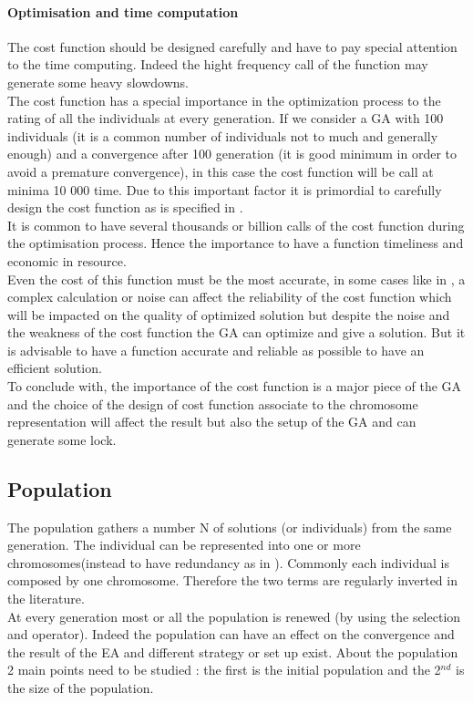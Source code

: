 \paragraph*{Optimisation and time computation}
The cost function should be designed carefully and have to pay special attention to the time computing. Indeed the hight frequency call of the function may generate some heavy slowdowns. \\
The cost function has a special importance in the optimization process to  the rating of all the individuals at every generation. If we consider a GA with 100 individuals (it is a common number of individuals  not to much and  generally enough) and a convergence after 100 generation (it is good minimum in order to avoid a premature convergence), in this case the cost function will be call at minima 10 000 time. Due  to this important factor it is primordial to carefully design the cost function as is specified in \cite{70*arabas1994}.\\
It is common to have several thousands or billion calls of the cost function during the optimisation process.
  Hence the importance to have a function timeliness and economic in resource. \\
Even the cost of this function must be the most accurate, in some cases like in \cite{95*miller1995}, a complex calculation or noise can affect the reliability of the cost function which will be impacted on the quality of optimized solution but despite the noise and the weakness of the cost function the GA can optimize and give a solution. But it is advisable to have a function accurate and reliable as possible to have an efficient solution.\\
 To conclude with, the importance of the cost function is a major piece of the GA and the choice of the design of cost function associate to the chromosome representation will affect the result but also the setup of the GA and can generate some lock. \\

	
\subsection{Population }\label{sec:Population}
The population gathers a number N of solutions (or individuals) from the same generation. The individual can be represented into one or  more chromosomes(instead to have redundancy as in \cite{ 121*ronald1997}). Commonly each individual is composed by one chromosome. Therefore the two terms are regularly inverted in the literature.\\
At every generation most or all the population is renewed (by using the selection and operator). Indeed the population can have an effect on the convergence and the result of the EA and different strategy or set up exist. About the population 2 main points need to be studied : the first is the initial population and the 2$^{nd}$ is the size of the population.  

